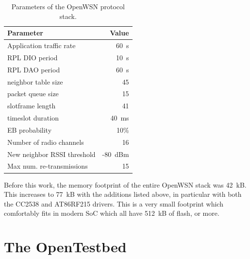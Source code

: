 \documentclass[sensors,article,submit,moreauthors,pdftex]{Definitions/mdpi}
\begin{document}
\begin{table}
\centering
    \begin{tabular}{|l|r|}
        \hline
        Parameter                           &   Value \\ \hline
        Application traffic rate            &    60~s \\
        RPL DIO period                      &    10~s \\
        RPL DAO period                      &    60~s \\
        neighbor table size                 &      45 \\
        packet queue size                   &      15 \\
        slotframe length                    &      41 \\
        timeslot duration                   &   40~ms \\
        EB probability                      &    10\% \\
        Number of radio channels            &      16 \\
        New neighbor RSSI threshold         & -80~dBm \\
        Max num. re-transmissions           &      15 \\ \hline
    \end{tabular}
    \caption{Parameters of the OpenWSN protocol stack.}
    \label{tab:stack_params}
\end{table}


Before this work, the memory footprint of the entire OpenWSN stack was 42~kB.
This increases to 77~kB with the additions listed above, in particular with both the CC2538 and AT86RF215 drivers.
This is a very small footprint which comfortably fits in modern SoC which all have 512~kB of flash, or more.

\section{The OpenTestbed}
\label{sec:opentested}

\end{document}
